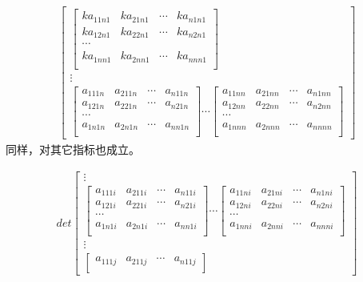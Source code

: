 \documentclass[twoside,a4paper,CCT]{cctart}   %
\begin{document}
\begin{list}{}
\begin{align*}
\begin{bmatrix}
\begin{bmatrix}
ka_{11n1}& ka_{21n1}&\cdots&ka_{n1n1}\\
ka_{12n1}& ka_{22n1}&\cdots&ka_{n2n1}\\
 \cdots\\
ka_{1nn1}& ka_{2nn1}&\cdots&ka_{nnn1}\\
\end{bmatrix}\\
\vdots\\
\begin{bmatrix}
a_{111n}& a_{211n}&\cdots&a_{n11n}\\
a_{121n}& a_{221n}&\cdots&a_{n21n}\\
\cdots\\
a_{1n1n}& a_{2n1n}&\cdots&a_{nn1n}\\
\end{bmatrix}
\cdots
\begin{bmatrix}
a_{11nn}& a_{21nn}&\cdots&a_{n1nn}\\
a_{12nn}& a_{22nn}&\cdots&a_{n2nn}\\
\cdots\\
a_{1nnn}& a_{2nnn}&\cdots&a_{nnnn}\\
\end{bmatrix}
\end{bmatrix}
 \end{align*}
 同样，对其它指标也成立。
 \item
\begin{align*}
det
  \begin{bmatrix}
\vdots\\
 \begin{bmatrix}
 a_{111i}& a_{211i}&\cdots&a_{n11i}\\
 a_{121i}& a_{221i}&\cdots&a_{n21i}\\
 \cdots\\
a_{1n1i}& a_{2n1i}&\cdots&a_{nn1i}\\
\end{bmatrix}
\cdots
\begin{bmatrix}
  a_{11ni}& a_{21ni}&\cdots&a_{n1ni}\\
  a_{12ni}& a_{22ni}&\cdots&a_{n2ni}\\
 \cdots\\
 a_{1nni}& a_{2nni}&\cdots&a_{nnni}\\
 \end{bmatrix}\\
\vdots\\
\begin{bmatrix}
  a_{111j}& a_{211j}&\cdots&a_{n11j}\\

\end{bmatrix}
\end{bmatrix}
\end{align*}
\end{list}
\end{document}
